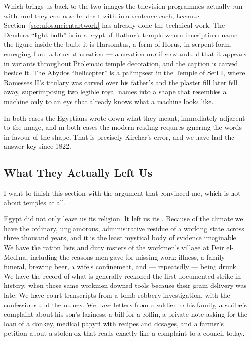 Which brings us back to the two images the television programmes actually run with, and they can
now be dealt with in a sentence each, because Section~\ref{sec:ufosancientartwork} has already
done the technical work. The Dendera ``light bulb'' is in a crypt of Hathor's temple whose
inscriptions name the figure inside the bulb: it is Harsomtus, a form of Horus, in serpent form,
emerging from a lotus at creation --- a creation motif so standard that it appears in variants
throughout Ptolemaic temple decoration, and the caption is carved beside it. The Abydos
``helicopter'' is a palimpsest in the Temple of Seti I, where Ramesses II's titulary was carved
over his father's and the plaster fill later fell away, superimposing two legible royal names into
a shape that resembles a machine only to an eye that already knows what a machine looks like.

In both cases the Egyptians wrote down what they meant, immediately adjacent to the image, and in
both cases the modern reading requires ignoring the words in favour of the shape. That is
precisely Kircher's error, and we have had the answer key since 1822.

\subsection{What They Actually Left Us}\label{sec:egyptpaperwork}

I want to finish this section with the argument that convinced me, which is not about temples at
all.

Egypt did not only leave us its religion. It left us its . Because of the climate we
have the ordinary, unglamorous, administrative residue of a working state across three thousand
years, and it is the least mystical body of evidence imaginable. We have the ration lists and duty
rosters of the workmen's village at Deir el-Medina, including the reasons men gave for missing
work: illness, a family funeral, brewing beer, a wife's confinement, and --- repeatedly --- being
drunk. We have the record of what is generally reckoned the first documented strike in history,
when those same workmen downed tools because their grain delivery was late. We have court
transcripts from a tomb-robbery investigation, with the confessions and the names. We have
letters from a soldier to his family, a scribe's complaint about his son's laziness, a bill for a
coffin, a private note asking for the loan of a donkey, medical papyri with recipes and dosages,
and a farmer's petition about a stolen ox that reads exactly like a complaint to a council today.

